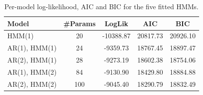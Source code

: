 \begin{table}[ht]
\centering
\begin{tabular}{lcccc}
\hline
Model & \#Params & LogLik & AIC & BIC \\
\hline
HMM(1) & 20 & -10388.87 & 20817.73 & 20926.10 \\
AR(1), HMM(1) & 24 & -9359.73 & 18767.45 & 18897.47 \\
AR(2), HMM(1) & 28 & -9273.19 & 18602.38 & 18754.06 \\
AR(1), HMM(2) & 84 & -9130.90 & 18429.80 & 18884.88 \\
AR(2), HMM(2) & 100 & -9045.40 & 18290.79 & 18832.49 \\
\hline
\end{tabular}
\caption{Per-model log-likelihood, AIC and BIC for the five fitted HMMs.}
\label{tab:model_stats}
\end{table}
